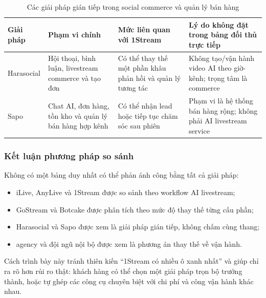 \begin{table}[H]
    \centering
    \footnotesize
    \setlength{\tabcolsep}{4pt}
    \renewcommand{\arraystretch}{1.25}
    \caption{Các giải pháp gián tiếp trong social commerce và quản lý bán hàng}
    \label{tab:indirect-solutions}
    \begin{tabularx}{\linewidth}{@{}L{2.8cm}L{3.3cm}Y Y@{}}
        \toprule
        \textbf{Giải pháp} & \textbf{Phạm vi chính} &
        \textbf{Mức liên quan với 1Stream} &
        \textbf{Lý do không đặt trong bảng đối thủ trực tiếp} \\ \midrule

        Harasocial &
        Hội thoại, bình luận, livestream commerce và tạo đơn &
        Có thể thay thế một phần khâu phản hồi và quản lý tương tác &
        Không tạo/vận hành video AI theo giờ-kênh; trọng tâm là commerce \\

        Sapo &
        Chat AI, đơn hàng, tồn kho và quản lý bán hàng hợp kênh &
        Có thể nhận lead hoặc tiếp tục chăm sóc sau phiên &
        Phạm vi là hệ thống bán hàng rộng; không phải AI livestream service \\ \bottomrule
    \end{tabularx}
\end{table}

\subsubsection{Kết luận phương pháp so sánh}

Không có một bảng duy nhất có thể phản ánh công bằng tất cả giải pháp:
\begin{itemize}
    \item iLive, AnyLive và 1Stream được so sánh theo workflow AI livestream;
    \item GoStream và Botcake được phân tích theo mức độ thay thế từng cấu phần;
    \item Harasocial và Sapo được xem là giải pháp gián tiếp, không chấm cùng thang;
    \item agency và đội ngũ nội bộ được xem là phương án thay thế về vận hành.
\end{itemize}

Cách trình bày này tránh thiên kiến ``1Stream có nhiều ô xanh nhất'' và giúp chỉ
ra rõ hơn rủi ro thật: khách hàng có thể chọn một giải pháp trọn bộ trưởng thành,
hoặc tự ghép các công cụ chuyên biệt với chi phí và công vận hành khác nhau.
